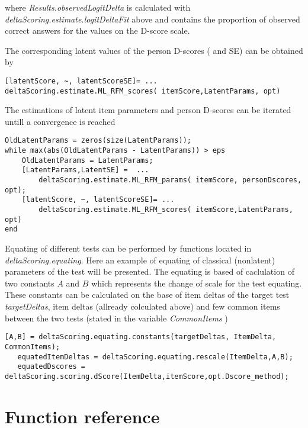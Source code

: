 \documentclass[12pt]{article}
\begin{document}
where {\itshape Results.observedLogitDelta} is calculated with {\itshape deltaScoring.estimate.logitDeltaFit} above and contains the proportion of observed correct answers for the values on the D-score scale.

The corresponding latent values of the person D-scores ( and SE) can be obtained by
\begin{lstlisting}[style=Matlab-bw]
[latentScore, ~, latentScoreSE]= ...
deltaScoring.estimate.ML_RFM_scores( itemScore,LatentParams, opt)
\end{lstlisting}

The estimations of latent item parameters and person D-scores can be iterated untill a convergence is reached

\begin{lstlisting}[style=Matlab-bw]
OldLatentParams = zeros(size(LatentParams));
while max(abs(OldLatentParams - LatentParams)) > eps
	OldLatentParams = LatentParams;
	[LatentParams,LatentSE] =  ...
		deltaScoring.estimate.ML_RFM_params( itemScore, personDscores, opt);
	[latentScore, ~, latentScoreSE]= ...
		deltaScoring.estimate.ML_RFM_scores( itemScore,LatentParams, opt)
end
\end{lstlisting}

Equating of different tests can be performed by functions located in {\itshape deltaScoring.equating}. Here an example of equating of classical (nonlatent) parameters of the test will be presented. The equating is based of caclulation of two constants $A$ and $B$ which represents the change of scale for the test equating. These constants can be calculated on the base of  item deltas of the target test {\itshape  targetDeltas}, item deltas (allready colculated above) and few common items between the two tests (stated in the variable {\itshape CommonItems} )

\begin{lstlisting}[style=Matlab-bw]
   [A,B] = deltaScoring.equating.constants(targetDeltas, ItemDelta, CommonItems);
   equatedItemDeltas = deltaScoring.equating.rescale(ItemDelta,A,B);
   equatedDscores = deltaScoring.scoring.dScore(ItemDelta,itemScore,opt.Dscore_method);
\end{lstlisting}


\section{Function reference}


\end{document}
